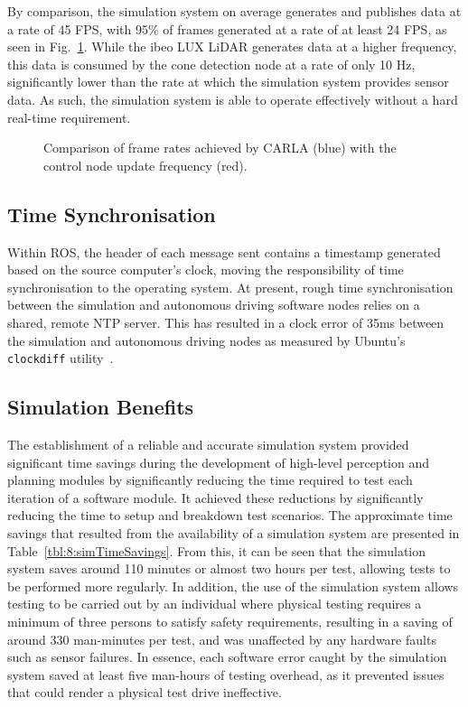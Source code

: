 By comparison, the simulation system on average generates and publishes data at a rate of 45 FPS, with 95\% of frames generated at a rate of at least 24 FPS, as seen in Fig.~\ref{fig:8:simFrameRates}.
While the ibeo LUX LiDAR generates data at a higher frequency, this data is consumed by the cone detection node at a rate of only 10 Hz, significantly lower than the rate at which the simulation system provides sensor data.
As such, the simulation system is able to operate effectively without a hard real-time requirement.

\begin{figure}[H] %
	\centering
	 \label{plot:simFrameRates}
	\caption[Comparison of frame rates]{Comparison of frame rates achieved by CARLA (blue) with the control node update frequency (red).}
	\label{fig:8:simFrameRates}
\end{figure}

\subsection{Time Synchronisation} \label{subsec:8:timeSynchronisation}

Within ROS, the header of each message sent contains a timestamp generated based on the source computer's clock, moving the responsibility of time synchronisation to the operating system.
At present, rough time synchronisation between the simulation and autonomous driving software nodes relies on a shared, remote NTP server.
This has resulted in a clock error of 35ms between the simulation and autonomous driving nodes as measured by Ubuntu's \texttt{clockdiff} utility~\cite{canonical_ltd._ubuntu_2019}.

\subsection{Simulation Benefits} \label{subsec:8:simulationBenefits}
The establishment of a reliable and accurate simulation system provided significant time savings during the development of high-level perception and planning modules by significantly reducing the time required to test each iteration of a software module.
It achieved these reductions by significantly reducing the time to setup and breakdown test scenarios.
The approximate time savings that resulted from the availability of a simulation system are presented in Table~\ref{tbl:8:simTimeSavings}.
From this, it can be seen that the simulation system saves around 110 minutes or almost two hours per test, allowing tests to be performed more regularly.
In addition, the use of the simulation system allows testing to be carried out by an individual where physical testing requires a minimum of three persons to satisfy safety requirements, resulting in a saving of around 330 man-minutes per test, and was unaffected by any hardware faults such as sensor failures.
In essence, each software error caught by the simulation system saved at least five man-hours of testing overhead, as it prevented issues that could render a physical test drive ineffective.

